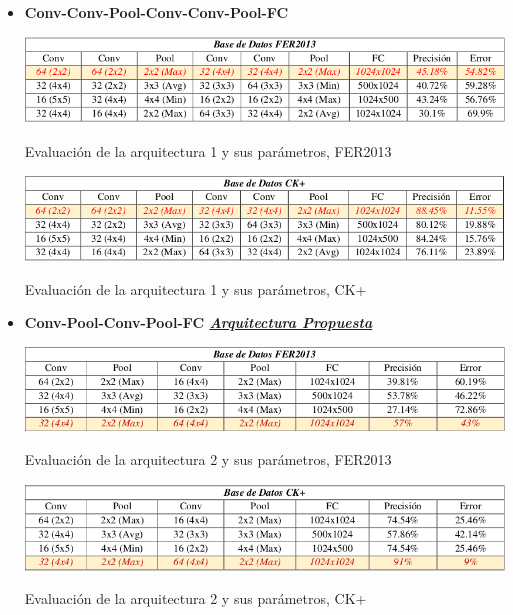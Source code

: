 \begin{itemize}
\item {\textbf{Conv-Conv-Pool-Conv-Conv-Pool-FC}

\begin{table}[H]
    \centering
    \includegraphics[width=140mm]{./Imagenes/tabla_arqui_1_fer.png} 
    \caption{Evaluación de la arquitectura 1 y sus parámetros, FER2013}
    \label{tab:tabla_arqui_1_fer}
\end{table}

\begin{table}[H]
    \centering
    \includegraphics[width=140mm]{./Imagenes/tabla_arqui_1_CK.png}
    \caption{Evaluación de la arquitectura 1 y sus parámetros, CK+}
    \label{tab:tabla_arqui_1_CK}
\end{table}

}

\item {\textbf{Conv-Pool-Conv-Pool-FC \underline{\textit{Arquitectura Propuesta}} }

\begin{table}[H]
    \centering
    \includegraphics[width=140mm]{./Imagenes/tabla_arqui_2_fer.png} 
    \caption{Evaluación de la arquitectura 2 y sus parámetros, FER2013}
    \label{tab:tabla_arqui_2_fer}
\end{table}

\begin{table}[H]
    \centering
    \includegraphics[width=140mm]{./Imagenes/tabla_arqui_2_CK.png}
    \caption{Evaluación de la arquitectura 2 y sus parámetros, CK+}
    \label{tab:tabla_arqui_2_CK}
\end{table}

}
\end{itemize}
